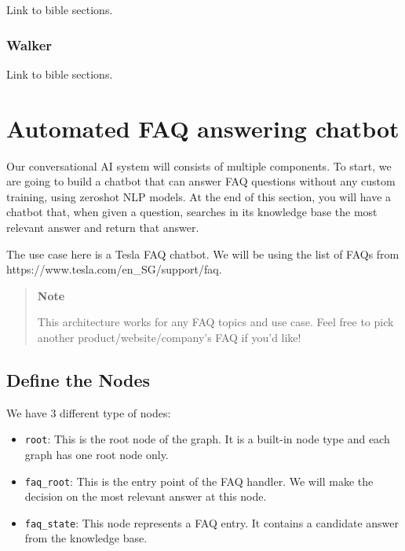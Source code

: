 Link to bible sections.

\subsubsection{Walker}\label{walker}

Link to bible sections.

\section{Automated FAQ answering
  chatbot}\label{automated-faq-answering-chatbot}

Our conversational AI system will consists of multiple components. To
start, we are going to build a chatbot that can answer FAQ questions
without any custom training, using zeroshot NLP models. At the end of
this section, you will have a chatbot that, when given a question,
searches in its knowledge base the most relevant answer and return that
answer.

The use case here is a Tesla FAQ chatbot. We will be using the list of
FAQs from https://www.tesla.com/en\_SG/support/faq.

\begin{quote}
    \textbf{Note}

    This architecture works for any FAQ topics and use case. Feel free to
    pick another product/website/company's FAQ if you'd like!
\end{quote}

\subsection{Define the Nodes}\label{define-the-nodes}

We have 3 different type of nodes:

\begin{itemize}
    \tightlist
    \item
          \lstinline!root!: This is the root node of the graph. It is a built-in
          node type and each graph has one root node only.
    \item
          \lstinline!faq_root!: This is the entry point of the FAQ handler. We
          will make the decision on the most relevant answer at this node.
    \item
          \lstinline!faq_state!: This node represents a FAQ entry. It contains a
          candidate answer from the knowledge base.
\end{itemize}

